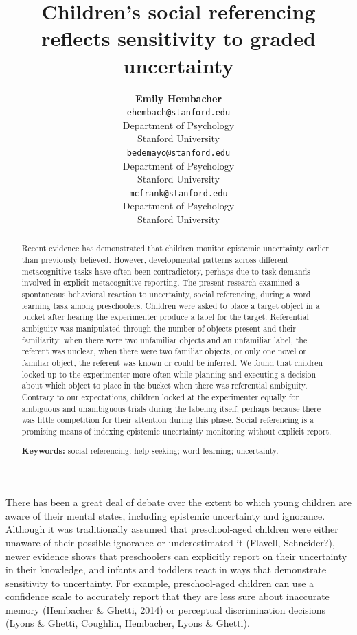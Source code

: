 \documentclass[10pt, letterpaper]{article}
\title{Children's social referencing reflects sensitivity to graded uncertainty}
\author{{\large \bf Emily  Hembacher} \\ \texttt{ehembach@stanford.edu} \\ Department of Psychology \\ Stanford University \And {\large \bf Benjamin deMayo} \\ \texttt{bedemayo@stanford.edu} \\ Department of Psychology \\ Stanford University \And {\large \bf Michael C. Frank} \\ \texttt{mcfrank@stanford.edu} \\ Department of Psychology \\ Stanford University}
\begin{document}
\maketitle

\begin{abstract}
Recent evidence has demonstrated that children monitor epistemic
uncertainty earlier than previously believed. However, developmental
patterns across different metacognitive tasks have often been
contradictory, perhaps due to task demands involved in explicit
metacognitive reporting. The present research examined a spontaneous
behavioral reaction to uncertainty, social referencing, during a word
learning task among preschoolers. Children were asked to place a target
object in a bucket after hearing the experimenter produce a label for
the target. Referential ambiguity was manipulated through the number of
objects present and their familiarity: when there were two unfamiliar
objects and an unfamiliar label, the referent was unclear, when there
were two familiar objects, or only one novel or familiar object, the
referent was known or could be inferred. We found that children looked
up to the experimenter more often while planning and executing a
decision about which object to place in the bucket when there was
referential ambiguity. Contrary to our expectations, children looked at
the experimenter equally for ambiguous and unambiguous trials during the
labeling itself, perhaps because there was little competition for their
attention during this phase. Social referencing is a promising means of
indexing epistemic uncertainty monitoring without explicit report.

\textbf{Keywords:}
social referencing; help seeking; word learning; uncertainty.
\end{abstract}

There has been a great deal of debate over the extent to which young
children are aware of their mental states, including epistemic
uncertainty and ignorance. Although it was traditionally assumed that
preschool-aged children were either unaware of their possible ignorance
or underestimated it (Flavell, Schneider?), newer evidence shows that
preschoolers can explicitly report on their uncertainty in their
knowledge, and infants and toddlers react in ways that demonstrate
sensitivity to uncertainty. For example, preschool-aged children can use
a confidence scale to accurately report that they are less sure about
inaccurate memory (Hembacher \& Ghetti, 2014) or perceptual
discrimination decisions (Lyons \& Ghetti, Coughlin, Hembacher, Lyons \&
Ghetti).
\end{document}

